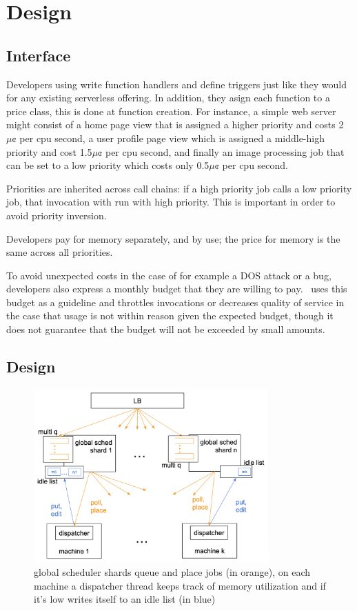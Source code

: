 \section{Design}\label{design}



\subsection{Interface}


Developers using \sys{} write function handlers and define triggers just like
they would for any existing serverless offering. In addition, they asign each
function to a price class, this is done at function creation. For instance, a
simple web server might consist of a home page view that is assigned a higher
priority and costs 2$\mu\cent$ per cpu second, a user profile page view which is
assigned a middle-high priority and cost 1.5$\mu\cent$ per cpu second, and
finally an image processing job that can be set to a low priority which costs
only 0.5$\mu\cent$ per cpu second.

Priorities are inherited across call chains: if a high priority job calls a low
priority job, that invocation with run with high priority. This is important in
order to avoid priority inversion.

Developers pay for memory separately, and by use; the price for memory is the
same across all priorities.

To avoid unexpected costs in the case of for example a DOS attack or a bug,
developers also express a monthly budget that they are willing to pay.\ \sys{}
uses this budget as a guideline and throttles invocations or decreases quality
of service in the case that usage is not within reason given the expected
budget, though it does not guarantee that the budget will not be exceeded by
small amounts.



\subsection{\Sys{} Design}

\begin{figure}[t]
    \centering
      \includegraphics[width=9cm]{img/overview.png}
      \caption{ global scheduler shards queue and place jobs (in orange), 
      on each machine a dispatcher thread keeps track of memory utilization 
      and if it's low writes itself to an idle list (in blue) }
    \label{fig:overview}
\end{figure}



